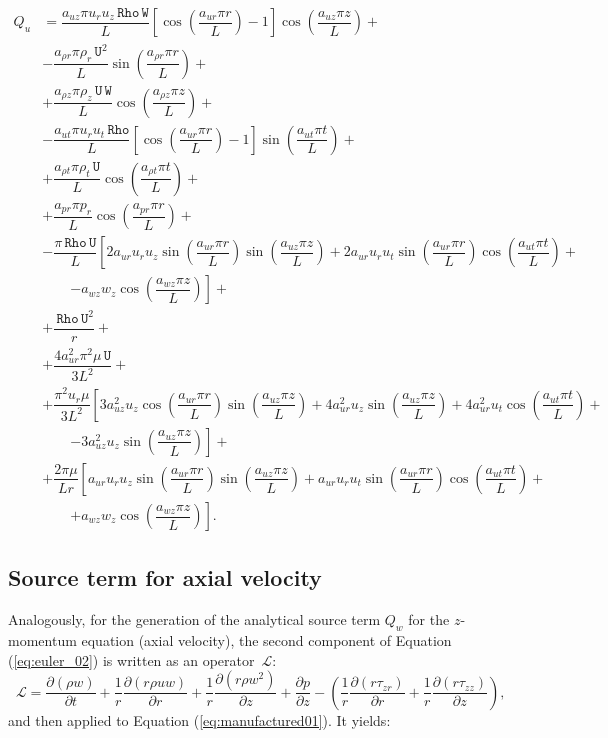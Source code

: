 \documentclass[10pt]{article}
\newcommand{\Diff}[2] {\dfrac{\partial( #1)}{\partial #2}}
\newcommand{\diff}[2] {\dfrac{\partial #1}{\partial #2}}
\newcommand{\Lo}{\,\mathcal{L}}
\newcommand{\Rho}{\,\mathtt{Rho}}
\newcommand{\U}{\,\mathtt{U}}
\newcommand{\W}{\,\mathtt{W}}
\begin{document}
\begin{equation}
 \begin{split}
 \displaystyle
Q_u &=\dfrac{a_{uz} \pi u_r u_z \Rho \W }{L} \left[\cos\left(\dfrac{a_{ur} \pi r}{L}\right)-1\right] \cos\left(\dfrac{a_{uz} \pi z}{L}\right)+ \\
&-\dfrac{a_{\rho r} \pi \rho_r \U^2 }{L}\sin\left(\dfrac{a_{\rho r} \pi r}{L}\right)+ \\
&+\dfrac{a_{\rho z} \pi \rho_z \U \W }{L}\cos\left(\dfrac{a_{\rho z} \pi z}{L}\right)+ \\
&-\dfrac{a_{ut} \pi u_r u_t \Rho}{L}\left[\cos\left(\dfrac{a_{ur} \pi r}{L}\right)-1\right]  \sin\left(\dfrac{a_{ut} \pi t}{L}\right)+ \\
&+\dfrac{a_{\rho t} \pi \rho_t \U }{L}\cos\left(\dfrac{a_{\rho t} \pi t}{L}\right)+ \\
&+\dfrac{a_{pr} \pi p_r }{L}\cos\left(\dfrac{a_{pr} \pi r}{L}\right)+ \\
&-\dfrac{\pi \Rho \U}{L}\left[2 a_{ur} u_r u_z \sin\left(\dfrac{a_{ur} \pi r}{L}\right) \sin\left(\dfrac{a_{uz} \pi z}{L}\right)+2 a_{ur} u_r u_t \sin\left(\dfrac{a_{ur} \pi r}{L}\right) \cos\left(\dfrac{a_{ut} \pi t}{L}\right)\right.+\\
&  \quad\quad\left. -a_{wz} w_z \cos\left(\dfrac{a_{wz} \pi z}{L}\right)\right] + \\
&+\dfrac{\Rho \U^2}{r}+\\
&+ \dfrac{4 a_{ur}^2 \pi^2 \mu \U}{3L^2}+ \\
&+\dfrac{\pi^2 u_r \mu}{3L^2}\left[3 a_{uz}^2 u_z \cos\left(\dfrac{a_{ur} \pi r}{L}\right) \sin\left(\dfrac{a_{uz} \pi z}{L}\right)+4 a_{ur}^2 u_z \sin\left(\dfrac{a_{uz} \pi z}{L}\right)+4 a_{ur}^2 u_t \cos\left(\dfrac{a_{ut} \pi t}{L}\right)\right.+\\
&  \quad\quad\left. -3 a_{uz}^2 u_z \sin\left(\dfrac{a_{uz} \pi z}{L}\right)\right] + \\
&+\dfrac{2 \pi \mu}{L r} \left[ a_{ur} u_r u_z \sin\left(\dfrac{a_{ur} \pi r}{L}\right) \sin\left(\dfrac{a_{uz} \pi z}{L}\right)+a_{ur} u_r u_t \sin\left(\dfrac{a_{ur} \pi r}{L}\right) \cos\left(\dfrac{a_{ut} \pi t}{L}\right)\right.+\\
&  \quad\quad\left. +a_{wz} w_z \cos\left(\dfrac{a_{wz} \pi z}{L}\right)\right].
\end{split}
\end{equation}
%
\subsection{Source term for axial velocity}
Analogously, for the generation of the analytical source term $Q_w$ for the $z$-momentum equation (axial velocity), the second component of Equation  (\ref{eq:euler_02})  is written as an  operator $\Lo$:
\begin{equation*}
   \Lo =\Diff{\rho w}{t} + \dfrac{1}{r}\Diff{r \rho  u w}{r}+ \dfrac{1}{r}\Diff{r \rho w^2 }{z}+\diff{p}{z}- \left(\dfrac{1}{r}\Diff{r \tau_{zr}}{r}+\dfrac{1}{r}\Diff{r \tau_{zz}}{z}\right) ,
\end{equation*}
and then applied to Equation  (\ref{eq:manufactured01}). It yields:
\end{document}
